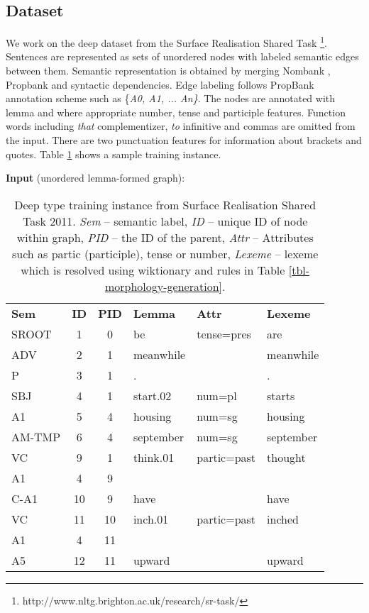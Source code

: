 \documentclass[11pt]{article}
\begin{document}
\subsection{Dataset} 
We work on the deep dataset from the Surface Realisation Shared Task \cite{belz2011first}\footnote{http://www.nltg.brighton.ac.uk/research/sr-task/}. Sentences are represented as sets of unordered nodes with labeled semantic edges between them. Semantic representation is obtained by merging Nombank \cite{L04-1228}, Propbank \cite{J05-1004} and syntactic dependencies. Edge labeling follows PropBank annotation scheme such as \{{\it A0, A1, ... An\}}. The nodes are annotated with lemma and where appropriate number, tense and participle features. Function words including {\it that} complementizer, {\it to} infinitive and commas are omitted from  the input. There are two punctuation features for information about brackets and quotes. Table \ref{training-instance} shows a sample training instance. 

\begin{table}
\scriptsize
\begin{tablenotes}
\item \textbf{Input} (unordered lemma-formed graph):
\end{tablenotes}
\begin{tabular}{lcclll}
\textbf{Sem} & \textbf{ID} & \textbf{PID} & \textbf{Lemma} & \textbf{Attr} & \textbf{Lexeme}\\
SROOT &	1 & 0 &	be &	tense=pres	&	are\\
ADV	&	2	&	1	&	meanwhile	&	& meanwhile\\
P	&	3	&	1	&	.	&	& .\\
SBJ	&	4	&	1	&	start.02	&	num=pl	& starts\\
A1	&	5	&	4	&	housing	&	num=sg	& housing\\
AM-TMP	&	6	&	4	&	september	&	num=sg	& september\\
VC	&	9	&	1	&	think.01	&	partic=past	& thought\\
A1	&	 4	&	9& & &\\
C-A1	&	10	&	9	&	have	&&have\\
VC	&	11	&	10	&	inch.01	&	partic=past &inched\\
A1	&	 4	&	11 & & &\\
A5	&	12	&	11	&	upward&&upward\\
\end{tabular} 
\caption{Deep type training instance from Surface Realisation Shared Task 2011. {\it Sem} -- semantic label, {\it ID} -- unique ID of node within graph, {\it PID} -- the ID of the parent, {\it Attr} -- Attributes such as partic (participle), tense or number, {\it Lexeme} -- lexeme which is resolved using wiktionary and rules in Table \ref{tbl-morphology-generation}.}
\label{training-instance}
\vspace*{-1.5em}
\end{table}
\end{document}
